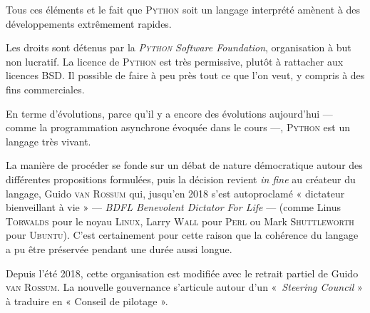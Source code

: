 Tous ces éléments et le fait que \textsc{Python} soit un langage interprété amènent à des développements extrêmement rapides. 




Les droits sont détenus par la \textit{\textsc{Python} Software Foundation}, organisation à but non lucratif. La licence de \textsc{Python} est très permissive, plutôt à rattacher aux licences BSD. Il possible de faire à peu près tout ce que l'on veut, y compris à des fins commerciales.

En terme d'évolutions, parce qu'il y a encore des évolutions aujourd'hui --- comme la programmation asynchrone évoquée dans le cours ---, \textsc{Python} est un langage très vivant. 

La manière de procéder se fonde sur un débat de nature démocratique autour des différentes propositions formulées, puis la décision revient \textit{in fine} au créateur du langage, Guido \textsc{van Rossum} qui, jusqu'en 2018 s'est autoproclamé « dictateur bienveillant à vie » --- \textit{BDFL Benevolent Dictator For Life} --- (comme Linus \textsc{Torwalds} pour le noyau \textsc{Linux}, Larry \textsc{Wall} pour \textsc{Perl} ou Mark \textsc{Shuttleworth} pour \textsc{Ubuntu}). C'est certainement pour cette raison que la cohérence du langage a pu être préservée pendant une durée aussi longue.

Depuis l'été 2018, cette organisation est modifiée avec le retrait partiel de Guido \textsc{van Rossum}. La nouvelle gouvernance s'articule autour d'un «~\textit{Steering Council} » à traduire en « Conseil de pilotage ».


